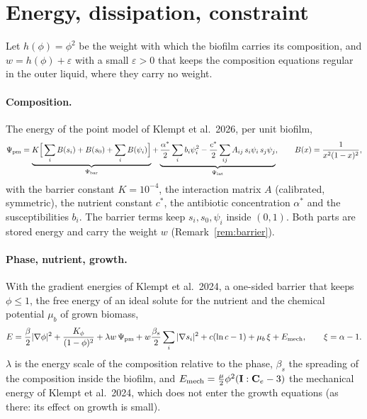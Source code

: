 \documentclass[11pt,a4paper]{article}
\begin{document}
\section{Energy, dissipation, constraint}

Let $h(\phi)=\phi^2$ be the weight with which the biofilm carries its composition, and
$w=h(\phi)+\varepsilon$ with a small $\varepsilon>0$ that keeps the composition equations
regular in the outer liquid, where they carry no weight.

\paragraph{Composition.} The energy of the point model of Klempt et al.\ 2026, per unit
biofilm,
\begin{equation}
\Psi_{\rm pm}=\underbrace{K\Big[\sum_iB(s_i)+B(s_0)+\sum_iB(\psi_i)\Big]}_{\Psi_{\rm bar}}
+\underbrace{\frac{\alpha^*}{2}\sum_ib_i\psi_i^2-\frac{c^*}{2}\sum_{ij}A_{ij}\,s_i\psi_i\,s_j\psi_j}_{\Psi_{\rm int}},
\qquad B(x)=\frac{1}{x^2(1-x)^2},
\label{eq:pm}
\end{equation}
with the barrier constant $K=10^{-4}$, the interaction matrix $A$ (calibrated, symmetric), the
nutrient constant $c^*$, the antibiotic concentration $\alpha^*$ and the susceptibilities
$b_i$. The barrier terms keep $s_i,s_0,\psi_i$ inside $(0,1)$. Both parts are stored energy
and carry the weight $w$ (Remark~\ref{rem:barrier}).

\paragraph{Phase, nutrient, growth.} With the gradient energies of Klempt et al.\ 2024, a
one-sided barrier that keeps $\phi\le1$, the free energy of an ideal solute for the nutrient
and the chemical potential $\mu_b$ of grown biomass,
\begin{equation}
E=\frac{\beta}{2}|\nabla\phi|^2+\frac{K_\phi}{(1-\phi)^2}
+\lambda w\,\Psi_{\rm pm}+w\frac{\beta_s}{2}\sum_i|\nabla s_i|^2
+c(\ln c-1)+\mu_b\,\xi+E_{\rm mech},\qquad \xi=\alpha-1 .
\label{eq:E}
\end{equation}
$\lambda$ is the energy scale of the composition relative to the phase, $\beta_s$ the
spreading of the composition inside the biofilm, and $E_{\rm mech}=\tfrac{\mu}{2}\phi^2
(\mathbf I:\mathbf C_e-3)$ the mechanical energy of Klempt et al.\ 2024, which does not enter
the growth equations (as there: its effect on growth is small).
\end{document}

